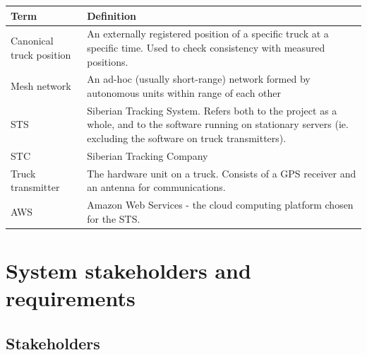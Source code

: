 \documentclass[a4paper,11pt]{report}
\begin{document}
\begin{center}
  \begin{tabular}[h!]{| p{} | p{} |}
    \hline
    \rowcolor{gray}
    Term & Definition \\
    \hline
    \hline
    Canonical truck position & An externally registered position of a specific truck at a specific time.  Used to check consistency with measured positions. \\\hline
    Mesh network & An ad-hoc (usually short-range) network formed by autonomous units within range of each other \\\hline
    STS & Siberian Tracking System.  Refers both to the project as a whole, and to the software running on stationary servers (ie. excluding the software on truck transmitters). \\\hline
    STC & Siberian Tracking Company \\\hline
    Truck transmitter & The hardware unit on a truck.  Consists of a GPS receiver and an antenna for communications. \\\hline
    AWS & Amazon Web Services - the cloud computing platform chosen for the STS. \\\hline
  \end{tabular}
\end{center}

\chapter{System stakeholders and requirements}
\label{cha:syst-stak-requ}
\thispagestyle{fancy}

\section{Stakeholders}
\label{sec:stakeholders}
\end{document}
